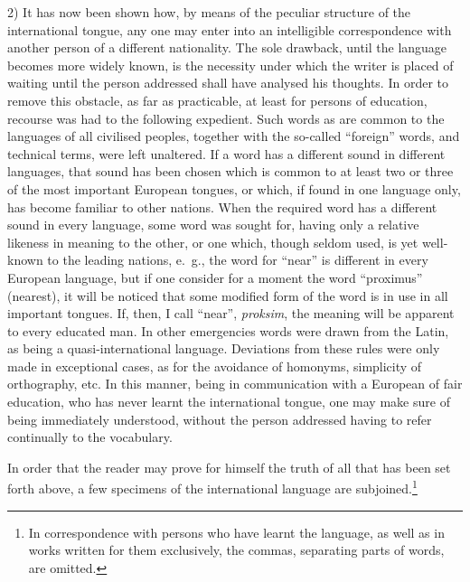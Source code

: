2) It has now been shown how, by means of the peculiar structure of the international tongue, any one may enter into an intelligible correspondence with another person of a different nationality. The sole drawback, until the language becomes more widely known, is the necessity under which the writer is placed of waiting until the person addressed shall have analysed his thoughts. In order to remove this obstacle, as far as practicable, at least for persons of education, recourse was had to the following expedient. Such words as are common to the languages of all civilised peoples, together with the so-called “foreign” words, and technical terms, were left unaltered. If a word has a different sound in different languages, that sound has been chosen which is common to at least two or three of the most important European tongues, or which, if found in one language only, has become familiar to other nations. When the required word has a different sound in every language, some word was sought for, having only a relative likeness in meaning to the other, or one which, though seldom used, is yet well-known to the leading nations, e.~g., the word for ``near'' is different in every European language, but if one consider for a moment the word ``proximus'' (nearest), it will be noticed that some modified form of the word is in use in all important tongues. If, then, I call ``near'', \emph{proksim}, the meaning will be apparent to every educated man. In other emergencies words were drawn from the Latin, as being a quasi-international language. Deviations from these rules were only made in exceptional cases, as for the avoidance of homonyms, simplicity of orthography, etc. In this manner, being in communication with a European of fair education, who has never learnt the international tongue, one may make sure of being immediately understood, without the person addressed having to refer continually to the vocabulary.

In order that the reader may prove for himself the truth of all that has been set forth above, a few specimens of the international language are subjoined.\footnote{In correspondence with persons who have learnt the language, as well as in works written for them exclusively, the commas, separating parts of words, are omitted.}
